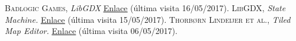 \begin{thebibliography}{aaaa}
 \textsc{Badlogic Games}, \textit{LibGDX} \href{https://libgdx.badlogicgames.com/}{\color{blue}\underline{Enlace}} (última visita 16/05/2017).
 \textsc{LibGDX}, \textit{State Machine.} \href{https://github.com/libgdx/gdx-ai/wiki/State-Machine}{\color{blue}\underline{Enlace}} (última visita 15/05/2017).
 \textsc{Thorbørn Lindeijer et al.}, \textit{Tiled Map Editor.} \href{http://www.mapeditor.org/}{\color{blue}\underline{Enlace}} (última visita 06/05/2017).
\end{thebibliography}